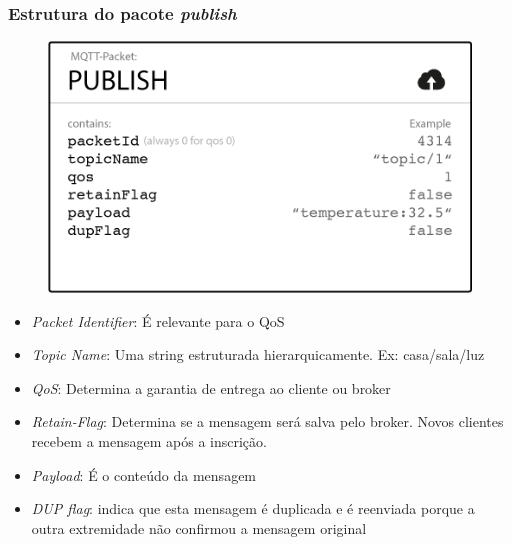 \documentclass{beamer}
\begin{document}

\begin{frame}
\frametitle{Estrutura do pacote \emph{publish}}
\begin{figure}
\centering
\includegraphics[scale=0.3]{MQTT-PublishPacket}
\end{figure}
\begin{itemize}
\item \emph{Packet Identifier}: É relevante para o QoS
\item \emph{Topic Name}: Uma string estruturada hierarquicamente. Ex: casa/sala/luz
\item \emph{QoS}: Determina a garantia de entrega ao cliente ou broker
\item \emph{Retain-Flag}: Determina se a mensagem será salva pelo broker. Novos clientes recebem a mensagem após a inscrição. 
\item \emph{Payload}: É o conteúdo da mensagem
\item \emph{DUP flag}: indica que esta mensagem é duplicada e é reenviada porque a outra extremidade não confirmou a mensagem original
\end{itemize}


\end{frame}



\end{document}
